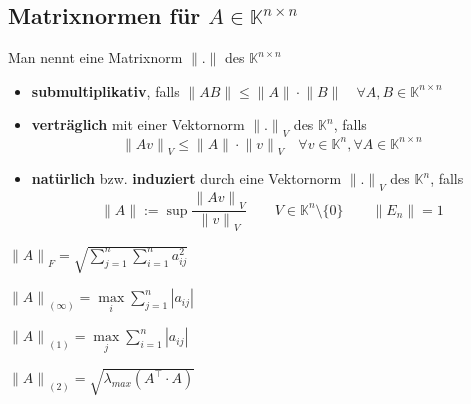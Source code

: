 \documentclass[6pt,a4paper]{scrartcl}
\newcommand{\norm}[1]{\ensuremath{\|#1\|}}														%
\begin{document}
\begin{multicols}{4}
	\subsection{Matrixnormen für $A \in \mathbb K^{n\times n}$}
	Man nennt eine Matrixnorm $\norm{.}$ des $\mathbb K^{n \times n}$
	\begin{itemize} \itemsep0pt
		\item \textbf{submultiplikativ}, falls $\norm{AB} \le \norm{A} \cdot \norm{B} \quad \forall A,B \in \mathbb K^{n\times n}$
		\item \textbf{verträglich} mit einer Vektornorm $\norm{.}_V$ des $\mathbb K^n$, falls 
			\begin{equation*}
					\norm{A v}_V \le \norm A \cdot \norm {v}_V \quad \forall v \in \mathbb K^n, \forall A \in \mathbb K^{n \times n} 
			\end{equation*}
		\item \textbf{natürlich} bzw. \textbf{induziert} durch eine Vektornorm $\norm{.}_V$ des $\mathbb K^n$, falls
			\begin{equation*}
				\norm{A} := \sup \frac{\norm{Av}_V}{\norm{v}_V} \qquad V \in \mathbb K^n \setminus \{0\} \qquad \norm{E_n}=1
			\end{equation*}
	\end{itemize}
	
	\begin{description}\itemsep-1pt
		\item[Frobeniusnorm:] $\norm{A}_F = \sqrt{\sum_{j=1}^{n} \sum_{i=1}^{n} a_{ij}^2}$
		\item[Zeilensummennorm] $\norm{A}_{(\infty)} = \underset{i}{\max} \sum\limits_{j=1}^n |a_{ij}|$
		\item[Spaltensummennorm:] $\norm{A}_{(1)} = \underset{j}{\max} \sum\limits_{i=1}^n |a_{ij}| $	
		\item[Spektralnorm:] $\norm{A}_{(2)} = \sqrt{\lambda_{max} (A^\top \cdot A)}$
	\end{description}






		


\end{multicols}
\end{document}
